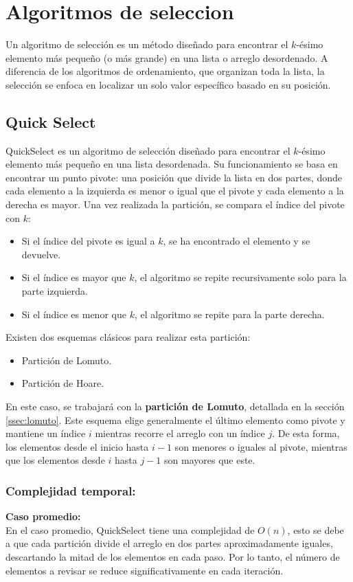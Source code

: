 \documentclass[9pt,letterpaper,onecolumn]{rho-class/rho}
\begin{document}
\newpage

\section{Algoritmos de seleccion}
Un algoritmo de selección es un método diseñado para encontrar el $k$-ésimo elemento más pequeño (o más grande) en una lista o arreglo desordenado.
 A diferencia de los algoritmos de ordenamiento, que organizan toda la lista, la selección se enfoca en localizar un solo valor específico basado 
 en su posición.
    \subsection{Quick Select}
QuickSelect es un algoritmo de selección diseñado para encontrar el $k$-ésimo elemento más pequeño en una lista desordenada. Su funcionamiento 
se basa en encontrar un punto pivote: una posición que divide la lista en dos partes, donde cada elemento a la izquierda es menor o 
igual que el pivote y cada elemento a la derecha es mayor.
Una vez realizada la partición, se compara el índice del pivote con $k$:
\begin{itemize}
    \item Si el índice del pivote es igual a $k$, se ha encontrado el elemento y se devuelve.
    \item Si el índice es mayor que $k$, el algoritmo se repite recursivamente solo para la parte izquierda.
    \item Si el índice es menor que $k$, el algoritmo se repite para la parte derecha.
\end{itemize}
Existen dos esquemas clásicos para realizar esta partición:
\begin{itemize}
    \item Partición de Lomuto.
    \item Partición de Hoare.
\end{itemize}
En este caso, se trabajará con la \textbf{partición de Lomuto}, detallada en la sección \ref{ssec:lomuto}. Este esquema elige 
generalmente el último elemento como pivote y mantiene un índice $i$ mientras recorre el arreglo con un índice $j$. De esta forma, 
los elementos desde el inicio hasta $i-1$ son menores o iguales al pivote, mientras que los elementos desde $i$ hasta $j-1$ son 
mayores que este.

    \subsubsection{Complejidad temporal:}
    \textbf{Caso promedio:}\\
    En el caso promedio, QuickSelect tiene una complejidad de $O(n)$, esto se debe a que cada partición divide el arreglo en dos partes 
    aproximadamente iguales, descartando la mitad de los elementos en cada paso. Por lo tanto, el número de elementos a revisar se 
    reduce significativamente en cada iteración.
\end{document}
